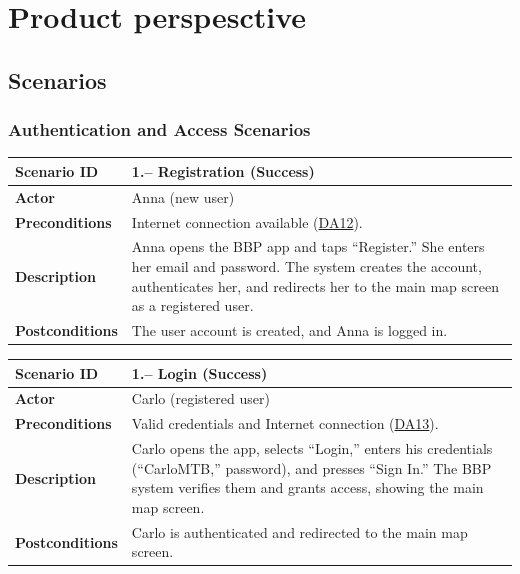 \section{Product perspesctive}
\label{sec:product_perspesctive}%

\subsection{Scenarios}
\label{subsec:scenarios}%

\subsubsection{Authentication and Access Scenarios}
\setcounter{aac}{1}
\newcommand{\caac}{\theaac\stepcounter{aac}}

\begin{center}
    \begin{longtable}{@{}|p{0.19\linewidth}|p{0.81\linewidth}|@{}}
        \hline
        \textbf{Scenario ID} & \textbf{1.\caac – Registration (Success)} \\
        \hline
        \textbf{Actor} & Anna (new user) \\
        \hline
        \textbf{Preconditions} & Internet connection available (\hyperref[da:12]{DA12}). \\
        \hline
        \textbf{Description} & Anna opens the BBP app and taps “Register.” She enters her email and password. The system creates the account, authenticates her, and redirects her to the main map screen as a registered user. \\
        \hline
        \textbf{Postconditions} & The user account is created, and Anna is logged in. \\
        \hline
        \end{longtable}
\end{center}

\begin{center}
    \begin{longtable}{@{}|p{0.19\linewidth}|p{0.81\linewidth}|@{}}
        \hline
        \textbf{Scenario ID} & \textbf{1.\caac – Login (Success)} \\
        \hline
        \textbf{Actor} & Carlo (registered user) \\
        \hline
        \textbf{Preconditions} & Valid credentials and Internet connection (\hyperref[da:13]{DA13}). \\
        \hline
        \textbf{Description} & Carlo opens the app, selects “Login,” enters his credentials (“CarloMTB,” password), and presses “Sign In.” The BBP system verifies them and grants access, showing the main map screen. \\
        \hline
        \textbf{Postconditions} & Carlo is authenticated and redirected to the main map screen. \\
        \hline
    \end{longtable}
\end{center}

